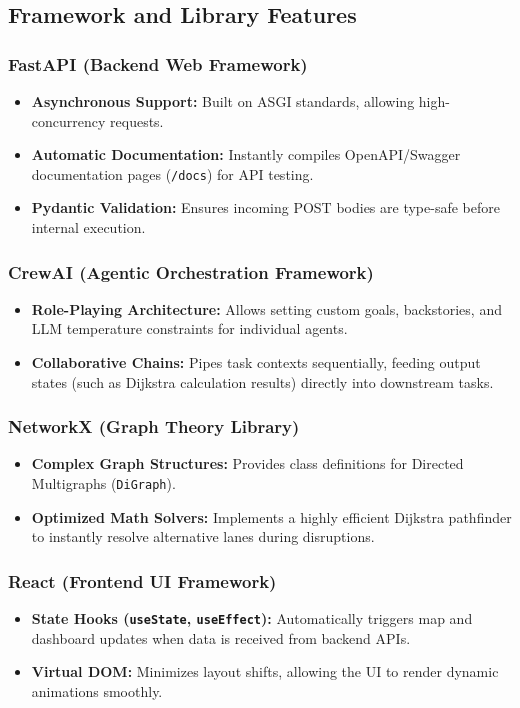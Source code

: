 \subsection[Framework and Library Features]{Framework and Library Features}

\subsubsection{FastAPI (Backend Web Framework)}
\begin{itemize}
    \item \textbf{Asynchronous Support:} Built on ASGI standards, allowing high-concurrency requests.
    \item \textbf{Automatic Documentation:} Instantly compiles OpenAPI/Swagger documentation pages (\texttt{/docs}) for API testing.
    \item \textbf{Pydantic Validation:} Ensures incoming POST bodies are type-safe before internal execution.
\end{itemize}

\subsubsection{CrewAI (Agentic Orchestration Framework)}
\begin{itemize}
    \item \textbf{Role-Playing Architecture:} Allows setting custom goals, backstories, and LLM temperature constraints for individual agents.
    \item \textbf{Collaborative Chains:} Pipes task contexts sequentially, feeding output states (such as Dijkstra calculation results) directly into downstream tasks.
\end{itemize}

\subsubsection{NetworkX (Graph Theory Library)}
\begin{itemize}
    \item \textbf{Complex Graph Structures:} Provides class definitions for Directed Multigraphs (\texttt{DiGraph}).
    \item \textbf{Optimized Math Solvers:} Implements a highly efficient Dijkstra pathfinder to instantly resolve alternative lanes during disruptions.
\end{itemize}

\subsubsection{React (Frontend UI Framework)}
\begin{itemize}
    \item \textbf{State Hooks (\texttt{useState}, \texttt{useEffect}):} Automatically triggers map and dashboard updates when data is received from backend APIs.
    \item \textbf{Virtual DOM:} Minimizes layout shifts, allowing the UI to render dynamic animations smoothly.
\end{itemize}

